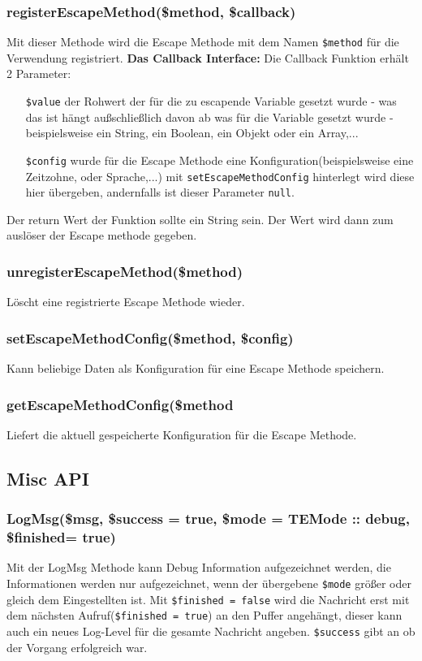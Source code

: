 \documentclass[a4paper,10pt]{article}
\begin{document}
\subsubsection{registerEscapeMethod(\$method, \$callback)}
Mit dieser Methode wird die Escape Methode mit dem Namen {\tt \$method} f\"ur die Verwendung registriert.\newline
\newline
{\bf Das Callback Interface:}\newline
Die Callback Funktion erh\"alt 2 Parameter:
\begin{itemize}
  \item[{\tt \$value}] der Rohwert der f\"ur die zu escapende Variable gesetzt wurde - was das ist h\"angt au\ss{}schlie\ss{}lich davon ab was f\"ur die Variable gesetzt wurde - beispielsweise ein String, ein Boolean, ein Objekt oder ein Array,...
  \item[{\tt \$config}] wurde f\"ur die Escape Methode eine Konfiguration(beispielsweise eine Zeitzohne, oder Sprache,...) mit {\tt setEscapeMethodConfig} hinterlegt wird diese hier \"ubergeben, andernfalls ist dieser Parameter {\tt null}.
\end{itemize}
Der return Wert der Funktion sollte ein String sein. Der Wert wird dann zum ausl\"oser der Escape methode gegeben.

\subsubsection{unregisterEscapeMethod(\$method)}
L\"oscht eine registrierte Escape Methode wieder.

\subsubsection{setEscapeMethodConfig(\$method, \$config)}
Kann beliebige Daten als Konfiguration f\"ur eine Escape Methode speichern.

\subsubsection{getEscapeMethodConfig(\$method}
Liefert die aktuell gespeicherte Konfiguration f\"ur die Escape Methode.

\subsection{Misc API}

\subsubsection{LogMsg(\$msg, \$success = true, \$mode = TEMode :: debug, \$finished= true)}
Mit der LogMsg Methode kann Debug Information aufgezeichnet werden, die Informationen werden nur aufgezeichnet, wenn
der \"ubergebene {\tt \$mode} gr\"o\ss{}er oder gleich dem Eingestellten ist. Mit {\tt \$finished = false} wird die Nachricht
erst mit dem n\"achsten Aufruf({\tt \$finished = true}) an den Puffer angeh\"angt, dieser kann auch ein neues Log-Level f\"ur
die gesamte Nachricht angeben. {\tt \$success} gibt an ob der Vorgang erfolgreich war.
\end{document}
